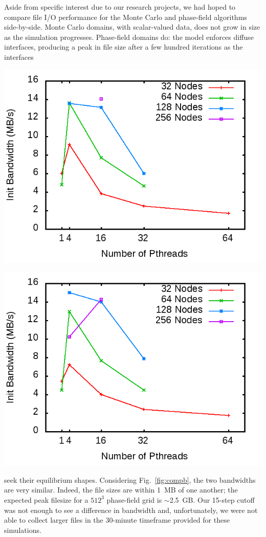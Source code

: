 \documentclass[11pt]{article}
\begin{document}
\begin{multicols*}{2}
Aside from specific interest due to our research projects, we had hoped to compare file I/O performance for the Monte Carlo and phase-field algorithms side-by-side.
Monte Carlo domains, with scalar-valued data, does not grow in size as the simulation progresses.
Phase-field domains do: 
the model enforces diffuse interfaces, producing a peak in file size after a 
few hundred iterations as the interfaces
\begin{center}
\begin{minipage}{0.4\textwidth}\centering
  \includegraphics[width=\textwidth]{img/prMC-initBW}

  \includegraphics[width=\textwidth]{img/pr-initBW}
\end{minipage}
\end{center}
seek their equilibrium shapes.
Considering Fig.~\ref{fig:compb}, the two bandwidths are very similar.
Indeed, the file sizes are within 1~MB of one another;
the expected peak filesize for a $512^3$ phase-field grid is $\sim$2.5~GB.
Our 15-step cutoff was not enough to see a difference in bandwidth and, unfortunately, we were not able to collect larger files in the 30-minute timeframe provided for these simulations.


\end{multicols*}
\end{document}
